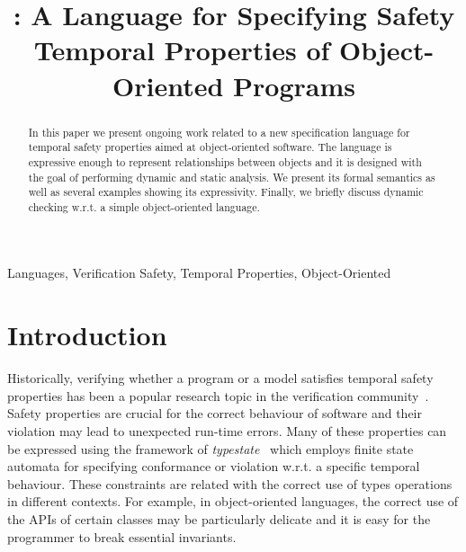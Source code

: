 \documentclass[preprint]{sigplanconf} %
\title{\TPL: A Language for Specifying Safety Temporal Properties of Object-Oriented Programs}
\theoremstyle{definition}
\theoremstyle{remark}
\begin{document}
\maketitle

\begin{abstract} %
In this paper we present ongoing work related to a new specification language for temporal safety properties aimed at object-oriented software.
The language is expressive enough to represent relationships between objects and it is designed with the goal of performing dynamic and static analysis. 
We present its formal semantics as well as several examples showing its expressivity.
Finally,  we briefly discuss dynamic checking w.r.t. a simple object-oriented language.
\end{abstract}
\terms Languages, Verification
\keywords Safety, Temporal Properties, Object-Oriented

\section{Introduction} %
Historically, verifying whether a program or a model satisfies  temporal safety properties has been a popular research topic in the
verification community~\cite{DBLP:books/daglib/0080029,dblp:conf/cav/ballr01,dblp:conf/oopsla/bierhoffa07,DBLP:journals/tse/Holzmann97}. Safety properties are crucial for the correct behaviour of software and their  violation  may lead to unexpected run-time errors.
%
Many of these properties can be expressed using the framework of {\em typestate}~\cite{strom1986} which employs finite state automata for specifying conformance or violation w.r.t. a specific temporal behaviour.
These constraints are related with the correct use of types operations in different contexts.
For example, in object-oriented languages, the correct use of the APIs of certain classes may be particularly delicate and it is easy for the programmer to break essential invariants.
\end{document}
